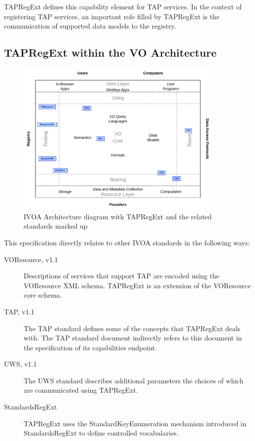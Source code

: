 \documentclass{ivoa}
\begin{document}
TAPRegExt defines this capability element for TAP services.  In the context
of registering TAP services, an important role filled by TAPRegExt is the 
communication of supported data models to the registry.


\subsection{TAPRegExt within the VO Architecture}

\label{architecture}

\begin{figure}[th]
\begin{center}
\includegraphics[width=0.9\textwidth]{role_diagram.pdf}
\end{center}
\caption{IVOA Architecture diagram with TAPRegExt and
the related standards marked up}
\label{fig:arch}
\end{figure}

This specification directly relates to other IVOA standards in the following
ways:


\begin{description}
\item[VOResource, v1.1 \citep{2018ivoa.spec.0625P}] Descriptions of services that support TAP are encoded
using the VOResource XML schema. TAPRegExt is an extension 
of the VOResource core schema.
\item[TAP, v1.1 \citep{2019ivoa.spec.0927D}]The TAP standard defines some of the concepts that TAPRegExt
deals with. The TAP standard document indirectly
refers to this document in the specification of its capabilities endpoint.
\item[UWS, v1.1 \citep{2016ivoa.spec.1024H}]The UWS standard describes additional parameters the choices 
of which are communicated using TAPRegExt.
\item[StandardsRegExt \citep{2012ivoa.spec.0508H}] TAPRegExt uses the StandardKeyEnumeration mechanism introduced
in StandardsRegExt to define controlled vocabularies.

\end{description}
\end{document}
